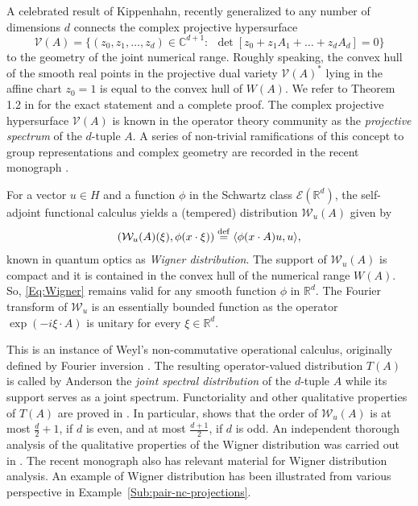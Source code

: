 \documentclass[11pt,reqno]{amsart}
\theoremstyle{plain}
\theoremstyle{definition}
\numberwithin{equation}{section}
\newcommand{\bydef}{\stackrel{\rm def}{=}}
\begin{document}
A celebrated result of Kippenhahn, recently generalized to any number of dimensions $d$ connects the complex projective hypersurface
$$ \mathcal{V}(A) = \{ (z_0, z_1, \ldots, z_d) \in {\mathbb C}^{d+1}: \ \ \det [ z_0 + z_1 A_1 + \ldots + z_d A_d] = 0\}$$
to the geometry of the joint numerical range. Roughly speaking, the convex hull of the smooth real points in the projective dual variety $\mathcal{V}(A)^\ast$ lying in the affine chart $z_0 =1$
is equal to the convex hull of $W(A)$. We refer to Theorem 1.2 in \cite{PSW} for the exact statement and a complete proof. The complex projective hypersurface $\mathcal{V}(A)$ is known in the operator theory community as the {\it projective spectrum} of the $d$-tuple $A$. A series of non-trivial ramifications of this concept to 
group representations and complex geometry are recorded in the recent monograph \cite{Yang}. 

For a vector $u \in H$ and a function $\phi$ in the Schwartz class ${\mathcal E}({\mathbb R}^d)$, the self-adjoint functional calculus yields a (tempered) distribution ${\mathcal W}_u(A)$ given by
\begin{align}\label{Eq:Wigner}
    ({\mathcal W}_u(A)(\xi), \phi ( x \cdot \xi))  \bydef \langle \phi(x \cdot A)u, u \rangle,
\end{align}
known in quantum optics as {\it Wigner distribution}. The support of  ${\mathcal W}_u(A)$ is compact and it is contained in the convex hull of the numerical range $W(A)$. So, \eqref{Eq:Wigner} remains valid for any smooth function $\phi$ in $\mathbb{R}^d$.
The Fourier transform of $\mathcal{W}_u$
is an essentially bounded function as the operator $\exp (- i \xi \cdot A)$ is unitary for every $\xi \in {\mathbb R}^d$.

This is an instance of Weyl's non-commutative operational calculus, originally defined by Fourier inversion \cite{Anderson}. The resulting operator-valued distribution $T(A)$ is called by Anderson the
{\it joint spectral distribution} of the $d$-tuple $A$ while its support serves as a joint spectrum. Functoriality and other qualitative properties of $T(A)$ are proved in \cite{Anderson}.
In particular, \cite[Lemma~3.8]{Anderson} shows that the order of ${\mathcal W}_u(A)$ is at most $\frac{d}{2}+1$, if $d$ is even, and at most $\frac{d+1}{2}$, if $d$ is odd.  An independent  thorough analysis of the qualitative properties of the Wigner distribution was carried out in \cite{SW}. The recent monograph \cite{Cohen} also has relevant material for Wigner distribution analysis. An example of Wigner distribution has been illustrated from various perspective in Example~\ref{Sub:pair-nc-projections}.
\end{document}
